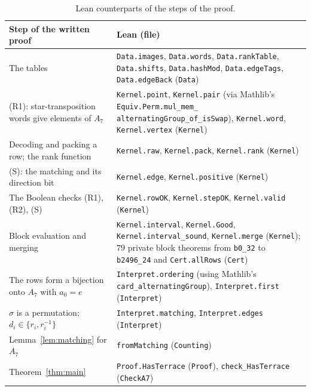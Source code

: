 \documentclass[11pt]{article}
\theoremstyle{definition}
\theoremstyle{remark}
\newcommand{\Alt}{A_7}
\begin{document}
{\begin{table}[ht]
\centering\footnotesize
\renewcommand{\arraystretch}{1.05}
\begin{tabular}{@{}>{\raggedright\arraybackslash}p{}>{\raggedright\arraybackslash}p{}@{}}
\hline
Step of the written proof & Lean (file) \\
\hline
The tables &
\texttt{Data.images}, \texttt{Data.words}, \texttt{Data.rankTable},
\texttt{Data.shifts}, \texttt{Data.hashMod}, \texttt{Data.edgeTags},
\texttt{Data.edgeBack} (\texttt{Data}) \\
(R1): star-transposition words give elements of $\Alt$ &
\texttt{Kernel.point}, \texttt{Kernel.pair} (via Mathlib's
\texttt{Equiv.\allowbreak Perm.\allowbreak mul\_\allowbreak mem\_\allowbreak
alternatingGroup\_\allowbreak of\_\allowbreak isSwap}),
\texttt{Kernel.word}, \texttt{Kernel.vertex} (\texttt{Kernel}) \\
Decoding and packing a row; the rank function &
\texttt{Kernel.raw}, \texttt{Kernel.pack}, \texttt{Kernel.rank}
(\texttt{Kernel}) \\
(S): the matching and its direction bit &
\texttt{Kernel.edge}, \texttt{Kernel.positive} (\texttt{Kernel}) \\
The Boolean checks (R1), (R2), (S) &
\texttt{Kernel.rowOK}, \texttt{Kernel.stepOK}, \texttt{Kernel.valid}
(\texttt{Kernel}) \\
Block evaluation and merging &
\texttt{Kernel.interval}, \texttt{Kernel.Good},
\texttt{Kernel.interval\_sound}, \texttt{Kernel.merge} (\texttt{Kernel});
$79$ private block theorems from \texttt{b0\_32} to \texttt{b2496\_24} and
\texttt{Cert.allRows} (\texttt{Cert}) \\
The rows form a bijection onto $\Alt$ with $a_0=e$ &
\texttt{Interpret.ordering} (using Mathlib's
\texttt{card\_\allowbreak alternatingGroup}), \texttt{Interpret.first}
(\texttt{Interpret}) \\
$\sigma$ is a permutation; $d_i\in\{r_i,r_i^{-1}\}$ &
\texttt{Interpret.matching}, \texttt{Interpret.edges} (\texttt{Interpret}) \\
Lemma~\ref{lem:matching} for $\Alt$ &
\texttt{fromMatching} (\texttt{Counting}) \\
Theorem~\ref{thm:main} &
\texttt{Proof.HasTerrace} (\texttt{Proof}),
\texttt{check\_HasTerrace} (\texttt{CheckA7}) \\
\hline
\end{tabular}
\caption{Lean counterparts of the steps of the proof.}
\label{tab:lean}
\end{table}

}
\end{document}

